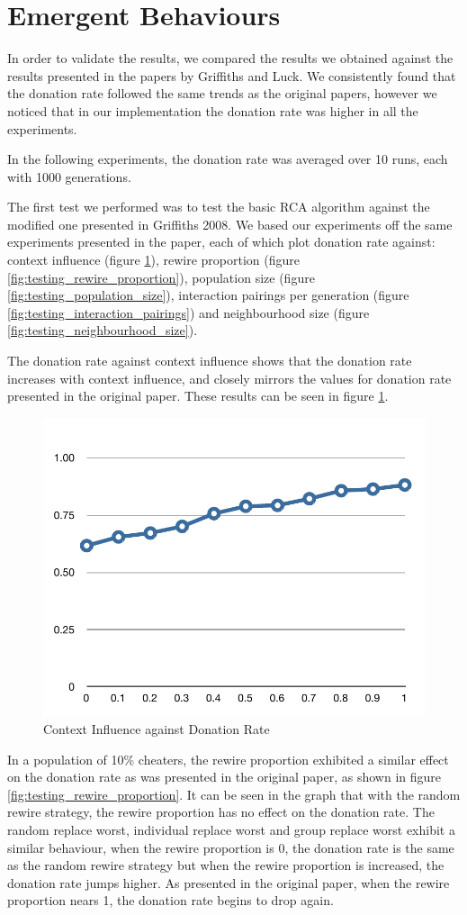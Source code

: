 \section{Emergent Behaviours}

In order to validate the results, we compared the results we obtained against the results presented in the papers by Griffiths and Luck. We consistently found that the donation rate followed the same trends as the original papers, however we noticed that in our implementation the donation rate was higher in all the experiments.

In the following experiments, the donation rate was averaged over 10 runs, each with 1000 generations.

The first test we performed was to test the basic RCA algorithm against the modified one presented in Griffiths 2008. We based our experiments off the same experiments presented in the paper, each of which plot donation rate against: context influence (figure \ref{fig:testing_context_influence}), rewire proportion (figure \ref{fig:testing_rewire_proportion}), population size (figure \ref{fig:testing_population_size}), interaction pairings per generation (figure \ref{fig:testing_interaction_pairings}) and neighbourhood size (figure \ref{fig:testing_neighbourhood_size}).

The donation rate against context influence shows that the donation rate increases with context influence, and closely mirrors the values for donation rate presented in the original paper. These results can be seen in figure \ref{fig:testing_context_influence}.

\begin{figure}[htbp]
	\centering
	\includegraphics[width=0.4\linewidth]{img/testing_context_influence.pdf}
	\caption{Context Influence against Donation Rate}
	\label{fig:testing_context_influence}
\end{figure}

In a population of 10\% cheaters, the rewire proportion exhibited a similar effect on the donation rate as was presented in the original paper, as shown in figure \ref{fig:testing_rewire_proportion}. It can be seen in the graph that with the random rewire strategy, the rewire proportion has no effect on the donation rate. The random replace worst, individual replace worst and group replace worst exhibit a similar behaviour, when the rewire proportion is 0, the donation rate is the same as the random rewire strategy but when the rewire proportion is increased, the donation rate jumps higher. As presented in the original paper, when the rewire proportion nears 1, the donation rate begins to drop again.

